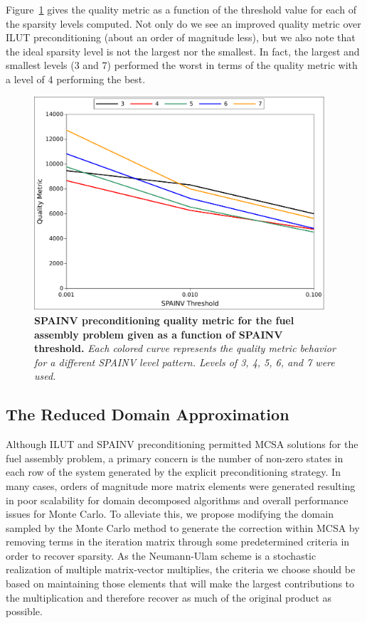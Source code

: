 Figure~\ref{fig:spainv_quality} gives the quality metric as a function
of the threshold value for each of the sparsity levels computed. Not
only do we see an improved quality metric over ILUT preconditioning
(about an order of magnitude less), but we also note that the ideal
sparsity level is not the largest nor the smallest. In fact, the
largest and smallest levels (3 and 7) performed the worst in terms of
the quality metric with a level of 4 performing the best.

\begin{figure}[t!]
  \begin{center}
    \includegraphics[width=4.25in]{chapters/spn_equations/spainv_quality.pdf}
  \end{center}
  \caption{\textbf{SPAINV preconditioning quality metric for the fuel
      assembly problem given as a function of SPAINV threshold.}
    \textit{Each colored curve represents the quality metric behavior
      for a different SPAINV level pattern. Levels of 3, 4, 5, 6, and
      7 were used.}}
  \label{fig:spainv_quality}
\end{figure}

\clearpage

\subsection{The Reduced Domain Approximation}
\label{subsec:spn_prec_rda}
Although ILUT and SPAINV preconditioning permitted MCSA solutions for
the fuel assembly problem, a primary concern is the number of non-zero
states in each row of the system generated by the explicit
preconditioning strategy. In many cases, orders of magnitude more
matrix elements were generated resulting in poor scalability for
domain decomposed algorithms and overall performance issues for Monte
Carlo. To alleviate this, we propose modifying the domain sampled by
the Monte Carlo method to generate the correction within MCSA by
removing terms in the iteration matrix through some predetermined
criteria in order to recover sparsity. As the Neumann-Ulam scheme is a
stochastic realization of multiple matrix-vector multiplies, the
criteria we choose should be based on maintaining those elements that
will make the largest contributions to the multiplication and
therefore recover as much of the original product as possible.

